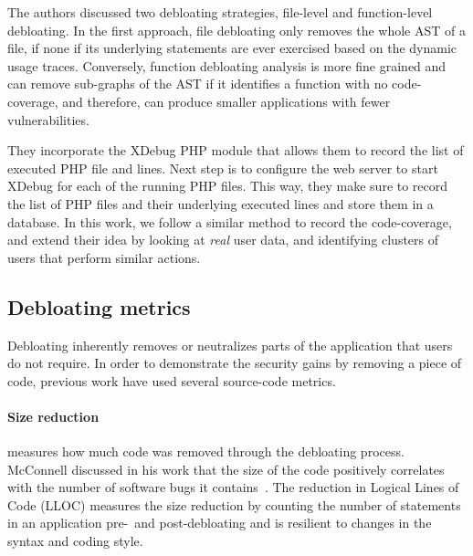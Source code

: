 The authors discussed two debloating strategies, file-level and function-level debloating. 
In the first approach, file debloating only removes the whole AST of a file, if none if its underlying statements are ever exercised based on the dynamic usage traces. 
Conversely, function debloating analysis is more fine grained and can remove sub-graphs of the AST if it identifies a function with no code-coverage, and therefore, can produce smaller applications with fewer vulnerabilities. 

%
They incorporate the XDebug PHP module that allows them to record the list of executed PHP file and lines. 
Next step is to configure the web server to start XDebug for each of the running PHP files. 
This way, they make sure to record the list of PHP files and their underlying executed lines and store them in a database. 
In this work, we follow a similar method to record the code-coverage, and extend their idea by looking at \emph{real} user data, and identifying clusters of users that perform similar actions. 

\subsection{Debloating metrics}

Debloating inherently removes or neutralizes parts of the application that users do not require. 
In order to demonstrate the security gains by removing a piece of code, previous work have used several source-code metrics. 

\paragraph{Size reduction} measures how much code was removed through the debloating process. 
McConnell discussed in his work that the size of the code positively correlates with the number of software bugs it contains~\cite{mcconnell2004code}. The reduction in Logical Lines of Code (LLOC) measures the size reduction by counting the number of statements in an application pre-~and post-debloating and is resilient to changes in the syntax and coding style.

